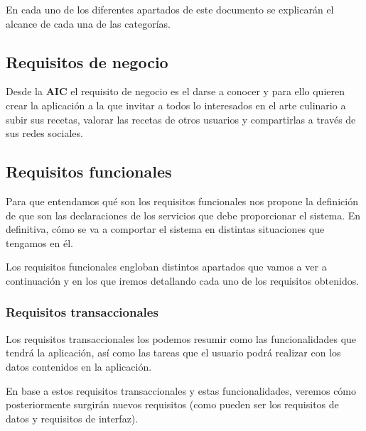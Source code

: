\documentclass{\ClassPath/viu-tfm-template}
\begin{document}
En cada uno de los diferentes apartados de este documento se explicarán el alcance de cada una de las categorías.


\subsection{Requisitos de negocio}
Desde la \textbf{AIC} el requisito de negocio es el darse a conocer y para ello quieren crear la aplicación a la que invitar a todos lo interesados en el arte culinario a subir sus recetas, valorar las recetas de otros usuarios y compartirlas a través de sus redes sociales.


\subsection{Requisitos funcionales}
Para que entendamos qué son los requisitos funcionales \textcite{Sommerville2005} nos propone la definición de que son las declaraciones de los servicios que debe proporcionar el sistema. En definitiva, cómo se va a comportar el sistema en distintas situaciones que tengamos en él.

Los requisitos funcionales engloban distintos apartados que vamos a ver a continuación y en los que iremos detallando cada uno de los requisitos obtenidos.


\subsubsection{Requisitos transaccionales}
Los requisitos transaccionales los podemos resumir como las funcionalidades que tendrá la aplicación, así como las tareas que el usuario podrá realizar con los datos contenidos en la aplicación.

En base a estos requisitos transaccionales y estas funcionalidades, veremos cómo posteriormente surgirán nuevos requisitos (como pueden ser los requisitos de datos y requisitos de interfaz).

\setcounter{reqno}{1}
\end{document}
